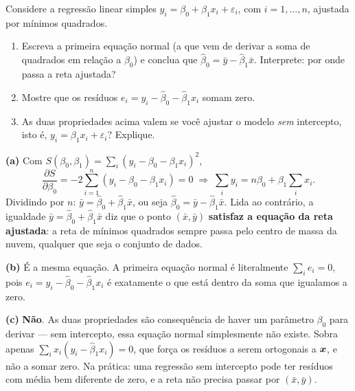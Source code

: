 \documentclass[11pt,a4paper]{article}
\begin{document}

\begin{exercicio}
Considere a regressão linear simples $y_i=\beta_0+\beta_1 x_i+\varepsilon_i$,
com $i=1,\dots,n$, ajustada por mínimos quadrados.
\begin{enumerate}[label=(\alph*),leftmargin=1.1cm]
  \item Escreva a primeira equação normal (a que vem de derivar a soma de
        quadrados em relação a $\beta_0$) e conclua que
        $\widehat\beta_0=\bar y-\widehat\beta_1\bar x$. Interprete: por onde passa
        a reta ajustada?
  \item Mostre que os resíduos $e_i=y_i-\widehat\beta_0-\widehat\beta_1 x_i$
        somam zero.
  \item As duas propriedades acima valem se você ajustar o modelo \emph{sem}
        intercepto, isto é, $y_i=\beta_1x_i+\varepsilon_i$? Explique.
\end{enumerate}
\end{exercicio}

\begin{solucao}
\textbf{(a)} Com $S(\beta_0,\beta_1)=\sum_i(y_i-\beta_0-\beta_1x_i)^2$,
\[
  \frac{\partial S}{\partial\beta_0} = -2\sum_{i=1}^n(y_i-\beta_0-\beta_1x_i) = 0
  \;\Longrightarrow\;
  \sum_i y_i = n\beta_0 + \beta_1\sum_i x_i .
\]
Dividindo por $n$: $\bar y=\widehat\beta_0+\widehat\beta_1\bar x$, ou seja
$\widehat\beta_0=\bar y-\widehat\beta_1\bar x$. Lida ao contrário, a igualdade
$\bar y=\widehat\beta_0+\widehat\beta_1\bar x$ diz que o ponto $(\bar x,\bar y)$
\textbf{satisfaz a equação da reta ajustada}: a reta de mínimos quadrados sempre
passa pelo centro de massa da nuvem, qualquer que seja o conjunto de dados.

\smallskip
\textbf{(b)} É a mesma equação. A primeira equação normal é literalmente
$\sum_i e_i=0$, pois $e_i=y_i-\widehat\beta_0-\widehat\beta_1x_i$ é exatamente o
que está dentro da soma que igualamos a zero.

\smallskip
\textbf{(c)} \textbf{Não}. As duas propriedades são consequência de haver um
parâmetro $\beta_0$ para derivar --- sem intercepto, essa equação normal
simplesmente não existe. Sobra apenas
$\sum_i x_i(y_i-\widehat\beta_1x_i)=0$, que força os resíduos a serem ortogonais a
$\bm{x}$, e não a somar zero. Na prática: uma regressão sem intercepto pode ter
resíduos com média bem diferente de zero, e a reta não precisa passar por
$(\bar x,\bar y)$.
\end{solucao}
\end{document}
